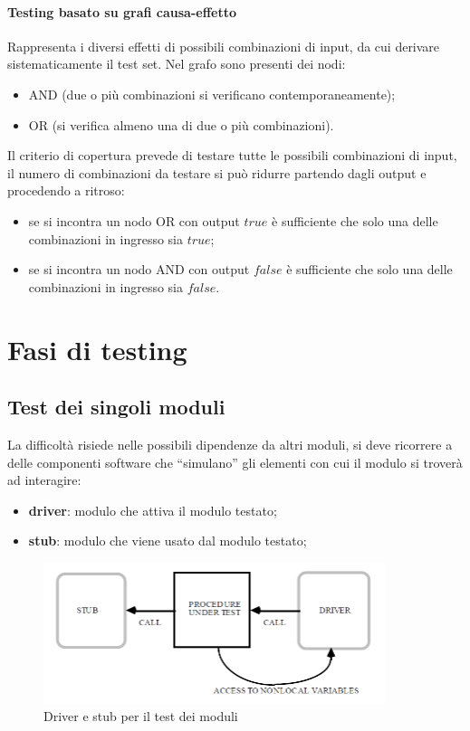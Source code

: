 \paragraph{Testing basato su grafi causa-effetto} Rappresenta i diversi effetti di possibili combinazioni di input, da cui derivare sistematicamente il test set. Nel grafo sono presenti dei nodi:
\begin{itemize}
    \item AND (due o più combinazioni si verificano contemporaneamente);
    \item OR (si verifica almeno una di due o più combinazioni).
\end{itemize}
Il criterio di copertura prevede di testare tutte le possibili combinazioni di input, il numero di combinazioni da testare si può ridurre partendo dagli output e procedendo a ritroso:
\begin{itemize}
    \item se si incontra un nodo OR con output $true$ è sufficiente che solo una delle combinazioni in ingresso sia $true$;
    \item se si incontra un nodo AND con output $false$ è sufficiente che solo una delle combinazioni in ingresso sia $false$.
\end{itemize}

\section{Fasi di testing}

\subsection{Test dei singoli moduli}

La difficoltà risiede nelle possibili dipendenze da altri moduli, si deve ricorrere a delle componenti software che “simulano” gli elementi con cui il modulo si troverà ad interagire:
\begin{itemize}
    \item \textbf{driver}: modulo che attiva il modulo testato; 
    \item \textbf{stub}: modulo che viene usato dal modulo testato;
\end{itemize}

\begin{figure}[H]
    \centering
    \includegraphics[width=0.75\linewidth]{assets/driver-stub.png}
    \caption{Driver e stub per il test dei moduli}
    \label{fig:driver-stub}
\end{figure}

